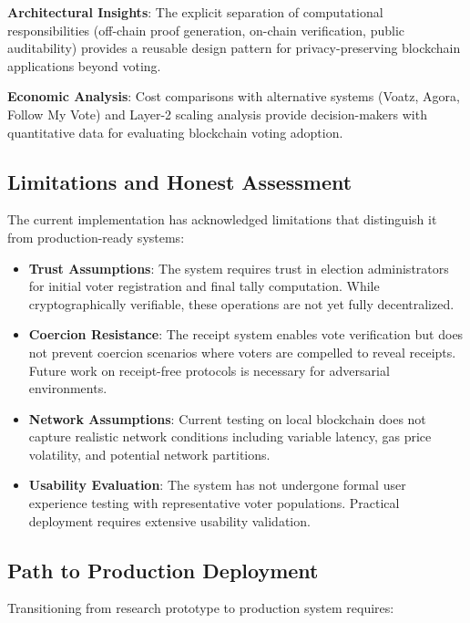\documentclass[conference]{IEEEtran}
\begin{document}
\textbf{Architectural Insights}: The explicit separation of computational responsibilities (off-chain proof generation, on-chain verification, public auditability) provides a reusable design pattern for privacy-preserving blockchain applications beyond voting.

\textbf{Economic Analysis}: Cost comparisons with alternative systems (Voatz, Agora, Follow My Vote) and Layer-2 scaling analysis provide decision-makers with quantitative data for evaluating blockchain voting adoption.

\subsection{Limitations and Honest Assessment}

The current implementation has acknowledged limitations that distinguish it from production-ready systems:

\begin{itemize}
    \item \textbf{Trust Assumptions}: The system requires trust in election administrators for initial voter registration and final tally computation. While cryptographically verifiable, these operations are not yet fully decentralized.
    
    \item \textbf{Coercion Resistance}: The receipt system enables vote verification but does not prevent coercion scenarios where voters are compelled to reveal receipts. Future work on receipt-free protocols is necessary for adversarial environments.
    
    \item \textbf{Network Assumptions}: Current testing on local blockchain does not capture realistic network conditions including variable latency, gas price volatility, and potential network partitions.
    
    \item \textbf{Usability Evaluation}: The system has not undergone formal user experience testing with representative voter populations. Practical deployment requires extensive usability validation.
\end{itemize}

\subsection{Path to Production Deployment}

Transitioning from research prototype to production system requires:
\end{document}
